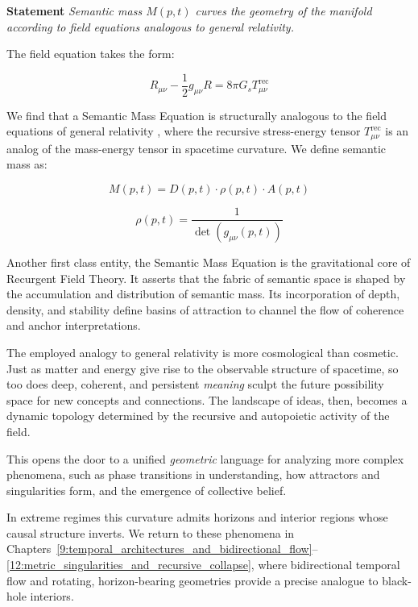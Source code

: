 \textbf{Statement} \textit{Semantic mass \(M(p,t)\) curves the geometry of the manifold according to field equations analogous to general relativity.}

The field equation takes the form:

\begin{equation}
R_{\mu\nu} - \frac{1}{2}g_{\mu\nu}R = 8\pi G_s T^{\text{rec}}_{\mu\nu}
\end{equation}

We find that a Semantic Mass Equation is structurally analogous to the field equations of general relativity \autocite{Einstein1915, MisnerThorneWheeler1973, Wald1984}, where the recursive stress-energy tensor \(T^{\text{rec}}_{\mu\nu}\) is an analog of the mass-energy tensor in spacetime curvature. We define semantic mass as:

\begin{equation}
M(p,t) = D(p,t) \cdot \rho(p,t) \cdot A(p,t)
\end{equation}

\begin{equation}
\rho(p,t) = \frac{1}{\det(g_{\mu\nu}(p,t))}
\end{equation}

Another first class entity, the Semantic Mass Equation is the gravitational core of Recurgent Field Theory. It asserts that the fabric of semantic space is shaped by the accumulation and distribution of semantic mass. Its incorporation of depth, density, and stability define basins of attraction to channel the flow of coherence and anchor interpretations.

The employed analogy to general relativity is more cosmological than cosmetic. Just as matter and energy give rise to the observable structure of spacetime, so too does deep, coherent, and persistent \textit{meaning} sculpt the future possibility space for new concepts and connections. The landscape of ideas, then, becomes a dynamic topology determined by the recursive and autopoietic activity of the field.

This opens the door to a unified \textit{geometric} language for analyzing more complex phenomena, such as phase transitions in understanding, how attractors and singularities form, and the emergence of collective belief.

In extreme regimes this curvature admits horizons and interior regions whose causal structure inverts. We return to these phenomena in Chapters~\ref{9:temporal_architectures_and_bidirectional_flow}--\ref{12:metric_singularities_and_recursive_collapse}, where bidirectional temporal flow and rotating, horizon-bearing geometries provide a precise analogue to black-hole interiors.

